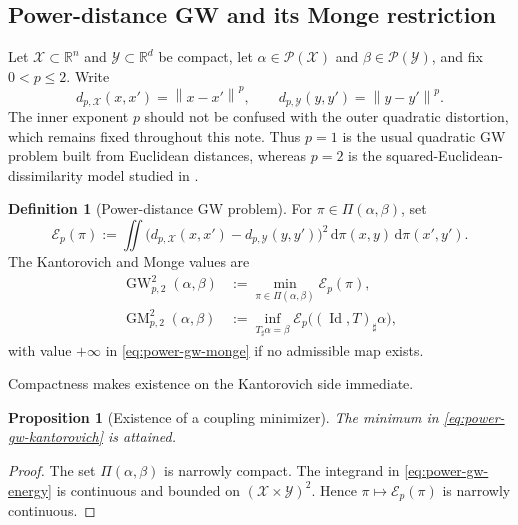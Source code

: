 \documentclass[11pt,a4paper]{article}
\newtheorem{proposition}[theorem]{Proposition}
\theoremstyle{definition}
\newtheorem{definition}[theorem]{Definition}
\theoremstyle{remark}
\newcommand{\R}{\mathbb R}
\newcommand{\Pcal}{\mathcal P}
\newcommand{\Ecal}{\mathcal E}
\newcommand{\Piopt}{\Pi}
\newcommand{\Id}{\operatorname{Id}}
\newcommand{\dd}{\,\mathrm d}
\newcommand{\norm}[1]{\left\lVert #1\right\rVert}
\newcommand{\GW}{\operatorname{GW}}
\newcommand{\GM}{\operatorname{GM}}
\begin{document}
\subsection{Power-distance GW and its Monge restriction}

Let \(\mathcal X\subset\R^n\) and \(\mathcal Y\subset\R^d\) be compact, let
\(\alpha\in\Pcal(\mathcal X)\) and \(\beta\in\Pcal(\mathcal Y)\), and fix
\(0<p\leq2\).  Write
\[
  d_{p,\mathcal X}(x,x')=\norm{x-x'}^p,
  \qquad
  d_{p,\mathcal Y}(y,y')=\norm{y-y'}^p.
\]
The inner exponent \(p\) should not be confused with the outer quadratic
distortion, which remains fixed throughout this note.  Thus \(p=1\) is the
usual quadratic GW problem built from Euclidean distances, whereas \(p=2\)
is the squared-Euclidean-dissimilarity model studied in
\citet{DumontLacombeVialard2025}.

\begin{definition}[Power-distance GW problem]
\label{def:power-gw}
For \(\pi\in\Piopt(\alpha,\beta)\), set
\begin{equation}
  \Ecal_p(\pi)
  :=
  \iint
  \bigl(d_{p,\mathcal X}(x,x')-d_{p,\mathcal Y}(y,y')\bigr)^2
  \dd\pi(x,y)\dd\pi(x',y').
  \label{eq:power-gw-energy}
\end{equation}
The Kantorovich and Monge values are
\begin{align}
  \GW_{p,2}^2(\alpha,\beta)
  &:=\min_{\pi\in\Piopt(\alpha,\beta)}\Ecal_p(\pi),
  \label{eq:power-gw-kantorovich}\\
  \GM_{p,2}^2(\alpha,\beta)
  &:=\inf_{T_\sharp\alpha=\beta}
  \Ecal_p\bigl((\Id,T)_\sharp\alpha\bigr),
  \label{eq:power-gw-monge}
\end{align}
with value \(+\infty\) in \eqref{eq:power-gw-monge} if no admissible map
exists.
\end{definition}

Compactness makes existence on the Kantorovich side immediate.

\begin{proposition}[Existence of a coupling minimizer]
\label{prop:gw-existence}
The minimum in \eqref{eq:power-gw-kantorovich} is attained.
\end{proposition}

\begin{proof}
The set \(\Piopt(\alpha,\beta)\) is narrowly compact.  The integrand in
\eqref{eq:power-gw-energy} is continuous and bounded on
\((\mathcal X\times\mathcal Y)^2\).  Hence
\(\pi\mapsto\Ecal_p(\pi)\) is narrowly continuous.
\end{proof}
\end{document}
